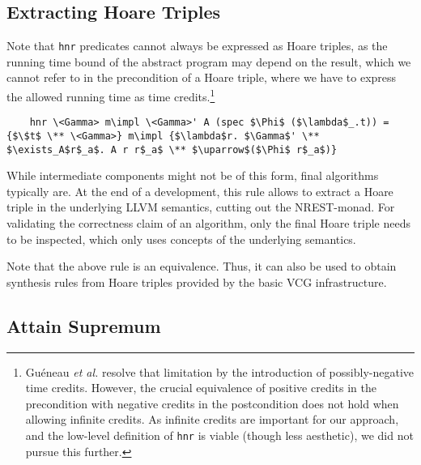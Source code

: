 \documentclass[acmsmall]{acmart}
\newcommand{\is}{\lstinline[language=isabelle]}
\newcommand{\etAl}{\emph{et al.}\xspace}
\begin{document}
\subsection{Extracting Hoare Triples}
Note that \is{hnr} predicates cannot always be expressed as Hoare triples, as the running time bound of the abstract program may depend on the result, which we cannot refer to in the precondition of a Hoare triple, where we have to express the allowed running time as time credits.\footnote{Gu\'{e}neau \etAl \cite{gueneau-chargueraud-jourdan-pottier-19,Gueneau19} resolve that limitation by the introduction of possibly-negative time credits.
However, the crucial equivalence of positive credits in the precondition with negative credits in the postcondition does not hold when allowing infinite credits.
%
As infinite credits are important for our approach, 
and the low-level definition of \is{hnr} is viable (though less aesthetic), we did not pursue this further.}
\begin{lstlisting} 
    hnr \<Gamma> m\impl \<Gamma>' A (spec $\Phi$ ($\lambda$_.t)) = {$\$t$ \** \<Gamma>} m\impl {$\lambda$r. $\Gamma$' \** $\exists_A$r$_a$. A r r$_a$ \** $\uparrow$($\Phi$ r$_a$)}
\end{lstlisting}
While intermediate components might not be of this form, final algorithms typically are.
At the end of a development, this rule allows to extract a Hoare triple in the underlying LLVM semantics, cutting out the NREST-monad.
For validating the correctness claim of an algorithm, only the final Hoare triple needs to be inspected, which only uses concepts of the underlying semantics.

Note that the above rule is an equivalence.
Thus, it can also be used to obtain synthesis rules from Hoare triples provided by the basic VCG infrastructure.


\subsection{Attain Supremum}\label{sec:att_sup}
\end{document}
